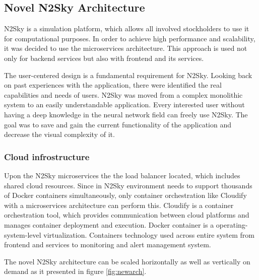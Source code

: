 \subsection{Novel N2Sky Architecture}\label{Contemporary N2Sky Architecture}

N2Sky is a simulation platform, which allows all involved stockholders to use it for computational purposes. In order to achieve high performance and scalability, it was decided to use the microservices architecture. This approach is used not only for backend services but also with frontend and its services.

The user-centered design is a fundamental requirement for N2Sky. Looking back on past experiences with the application, there were identified the real capabilities and needs of users. N2Sky was moved from a complex monolithic system to an easily understandable application. Every interested user without having a deep knowledge in the neural network field can freely use N2Sky.  The goal was to save and gain the current functionality of the application and decrease the visual complexity of it. 

\subsubsection{Cloud infrostructure}\label{Cloud infrostructure}


Upon the N2Sky microservices the the load balancer located, which includes shared cloud resources. Since in N2Sky environment needs to support thousands of Docker containers \cite{docker} simultaneously, only container orchestration like Cloudify \cite{cloudify} with a microservices architecture can perform this.  Cloudify is a container orchestration tool, which provides communication between cloud platforms and manages container deployment and execution. Docker container is a operating-system-level virtualization. Containers technology used across entire system from frontend and services to monitoring and alert management system. 

The novel N2Sky architecture can be scaled horizontally as well as vertically on demand as it presented in figure \ref{fig:newarch}.

